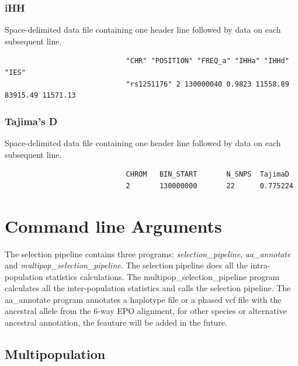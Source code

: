 \documentclass[a4paper,10pt]{article}
\begin{document}
                             \subsubsection{iHH}
                             Space-delimited data file containing one header line followed by data on each subsequent line.\\
                             \begin{verbatim}
                             "CHR" "POSITION" "FREQ_a" "IHHa" "IHHd" "IES"
                             "rs1251176" 2 130000040 0.9823 11558.89 83915.49 11571.13
                             \end{verbatim}
                             \subsubsection{Tajima's D}
                             Space-delimited data file containing one header line followed by data on each subsequent line.\\
                             \begin{verbatim}
                             CHROM   BIN_START       N_SNPS  TajimaD
                             2       130000000       22      0.775224
                             \end{verbatim}

                             \section{Command line Arguments}
                             The selection pipeline contains three programs:
                             \emph{selection\_pipeline}, \emph{aa\_annotate} and
                             \emph{multipop\_selection\_pipeline}. The selection pipeline does all the
                             intra-population statistics calculations. The multipop\_selection\_pipeline program
                             calculates all the inter-population statistics and calls the selection
                             pipeline. The aa\_annotate program annotates a haplotype file or a
                             phased vcf file with the ancestral allele from the 6-way EPO
                             alignment, for other species or alternative ancestral annotation, the
                             feauture will be added in the future.

                             \subsection{Multipopulation}
\end{document}
